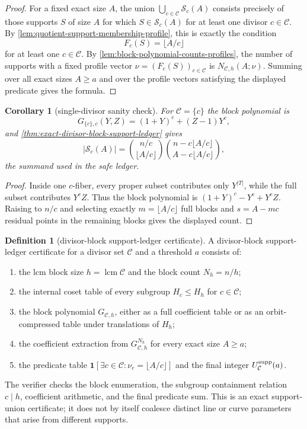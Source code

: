 \documentclass[11pt]{article}
\newtheorem{corollary}[corollary]{Corollary}
\theoremstyle{definition}
\newtheorem{definition}[definition]{Definition}
\theoremstyle{remark}
\begin{document}
\begin{proof}
For a fixed exact size $A$, the union
$\bigcup_{c\in\mathcal C}\mathcal S_c(A)$ consists precisely of those supports
$S$ of size $A$ for which $S\in\mathcal S_c(A)$ for at least one divisor
$c\in\mathcal C$.  By \cref{lem:quotient-support-membership-profile}, this is
exactly the condition
\[
        F_c(S)=\lfloor A/c\rfloor
\]
for at least one $c\in\mathcal C$.  By
\cref{lem:block-polynomial-counts-profiles}, the number of supports with a fixed
profile vector $\nu=(F_c(S))_{c\in\mathcal C}$ is
$N_{\mathcal C,h}(A;\nu)$.  Summing over all exact sizes $A\ge a$ and over the
profile vectors satisfying the displayed predicate gives the formula.
\end{proof}

\begin{corollary}[single-divisor sanity check]
\label{cor:single-divisor-support-ledger}
For $\mathcal C=\{c\}$ the block polynomial is
\[
        G_{\{c\},c}(Y,Z)=(1+Y)^c+(Z-1)Y^c,
\]
and \cref{thm:exact-divisor-block-support-ledger} gives
\[
        \left|\mathcal S_c(A)\right|
        =\binom{n/c}{\lfloor A/c\rfloor}
          \binom{n-c\lfloor A/c\rfloor}{A-c\lfloor A/c\rfloor},
\]
the summand used in the safe ledger.
\end{corollary}

\begin{proof}
Inside one $c$-fiber, every proper subset contributes only $Y^{|T|}$, while the
full subset contributes $Y^cZ$.  Thus the block polynomial is
$(1+Y)^c-Y^c+Y^cZ$.  Raising to $n/c$ and selecting exactly
$m=\lfloor A/c\rfloor$ full blocks and $s=A-mc$ residual points in the remaining
blocks gives the displayed count.
\end{proof}

\begin{definition}[divisor-block support-ledger certificate]
\label{def:divisor-block-support-ledger-certificate}
A divisor-block support-ledger certificate for a divisor set $\mathcal C$ and a
threshold $a$ consists of:
\begin{enumerate}[label=\textup{(\roman*)},leftmargin=2.2em]
\item the lcm block size $h=\operatorname{lcm}\mathcal C$ and the block count
$N_h=n/h$;
\item the internal coset table of every subgroup $H_c\le H_h$ for
$c\in\mathcal C$;
\item the block polynomial $G_{\mathcal C,h}$, either as a full coefficient table
or as an orbit-compressed table under translations of $H_h$;
\item the coefficient extraction from $G_{\mathcal C,h}^{N_h}$ for every exact
size $A\ge a$;
\item the predicate table
$\mathbf 1[\exists c\in\mathcal C:\nu_c=\lfloor A/c\rfloor]$ and the final
integer $U_{\mathcal C}^{\rm supp}(a)$.
\end{enumerate}
The verifier checks the block enumeration, the subgroup containment relation
$c\mid h$, coefficient arithmetic, and the final predicate sum.  This is an exact
support-union certificate; it does not by itself coalesce distinct line or curve
parameters that arise from different supports.
\end{definition}
\end{document}
